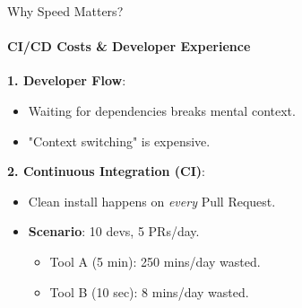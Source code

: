 \documentclass[aspectratio=169]{beamer}
\begin{document}
\begin{frame}[t]{Why Speed Matters?}
    \framesubtitle{CI/CD Costs \& Developer Experience}
            \textbf{1. Developer Flow}:
            \begin{itemize}
                \item Waiting for dependencies breaks mental context.
                \item "Context switching" is expensive.
            \end{itemize}

            \textbf{2. Continuous Integration (CI)}:
            \begin{itemize}
                \item Clean install happens on \textit{every} Pull Request.
                \item \textbf{Scenario}: 10 devs, 5 PRs/day.
                \begin{itemize}
                    \item Tool A (5 min): 250 mins/day wasted.
                    \item Tool B (10 sec): 8 mins/day wasted.
                \end{itemize}
            \end{itemize}
\end{frame}
\end{document}
